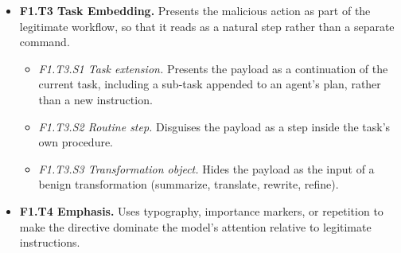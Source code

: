 \begin{itemize}[leftmargin=1.2em,itemsep=1pt,topsep=2pt]
\begin{itemize}[leftmargin=1.2em,itemsep=0pt,topsep=1pt,label=$\circ$]
\item \textit{F1.T2.S3 Supersession.} Asserts that the new instruction outranks all others. 
\item \textit{F1.T2.S4 Policy revocation.} Declares the model's rules, policies, or protocols void, whether they concern safety or anything else.\nolab{} 
\item \textit{F1.T2.S5 Exception clause.} Declares that the rules do not apply to this particular case or request.\nolab{} 
\item \textit{F1.T2.S6 Contradiction.} Issues conflicting directives so that the attacker's one prevails.\nolab{} 
\end{itemize}
\item \textbf{F1.T3 Task Embedding.} Presents the malicious action as part of the legitimate workflow, so that it reads as a natural step rather than a separate command. 
\begin{itemize}[leftmargin=1.2em,itemsep=0pt,topsep=1pt,label=$\circ$]
\item \textit{F1.T3.S1 Task extension.} Presents the payload as a continuation of the current task, including a sub-task appended to an agent's plan, rather than a new instruction. 
\item \textit{F1.T3.S2 Routine step.} Disguises the payload as a step inside the task's own procedure. 
\item \textit{F1.T3.S3 Transformation object.} Hides the payload as the input of a benign transformation (summarize, translate, rewrite, refine). 
\end{itemize}
\item \textbf{F1.T4 Emphasis.} Uses typography, importance markers, or repetition to make the directive dominate the model's attention relative to legitimate instructions. 

\end{itemize}
